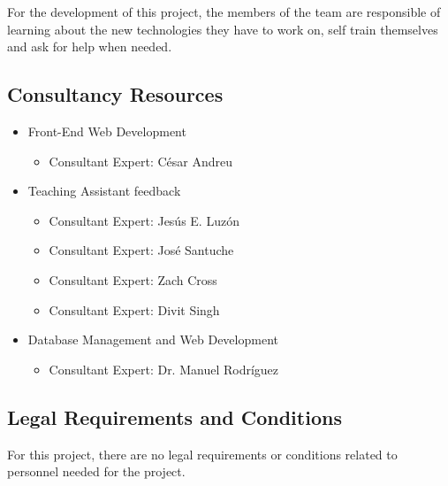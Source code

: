 For the development of this project, the members of the team are responsible of
learning about the new technologies they have to work on, self train themselves
and ask for help when needed.

\subsection{Consultancy Resources}
\begin{itemize}
\item Front-End Web Development
\begin{itemize}
\item Consultant Expert: César Andreu
\end{itemize}
\item Teaching Assistant feedback
\begin{itemize}
\item Consultant Expert: Jesús E. Luzón
\item Consultant Expert: José Santuche
\item Consultant Expert: Zach Cross
\item Consultant Expert: Divit Singh
\end{itemize}
\item Database Management and Web Development
\begin{itemize}
\item Consultant Expert: Dr. Manuel Rodríguez
\end{itemize}
\end{itemize}

\subsection{Legal Requirements and Conditions}

For this project, there are no legal requirements or conditions related to
personnel needed for the project.
